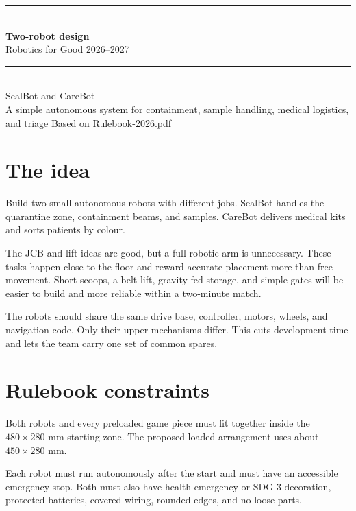 \documentclass[11pt,a4paper]{article}
\begin{document}
\hypersetup{pageanchor=false}

\begin{titlepage}
  \centering
  \vspace*{35mm}
  {\color{medicalblue}\rule{\textwidth}{1.2pt}}\\[10mm]
  {\Huge\bfseries Two-robot design\\[3mm]}
  {\Large Robotics for Good 2026--2027}\\[10mm]
  {\color{medicalblue}\rule{\textwidth}{1.2pt}}\\[18mm]
  {\Large SealBot and CareBot}\\[8mm]
  {\large A simple autonomous system for containment, sample handling, medical logistics, and triage}
  \vfill
  {\small Based on Rulebook-2026.pdf}
\end{titlepage}

\hypersetup{pageanchor=true}
\tableofcontents
\newpage
{}

\section{The idea}

Build two small autonomous robots with different jobs. SealBot handles the quarantine zone, containment beams, and samples. CareBot delivers medical kits and sorts patients by colour.

The JCB and lift ideas are good, but a full robotic arm is unnecessary. These tasks happen close to the floor and reward accurate placement more than free movement. Short scoops, a belt lift, gravity-fed storage, and simple gates will be easier to build and more reliable within a two-minute match.

The robots should share the same drive base, controller, motors, wheels, and navigation code. Only their upper mechanisms differ. This cuts development time and lets the team carry one set of common spares.

\section{Rulebook constraints}

Both robots and every preloaded game piece must fit together inside the $480 \times 280$ mm starting zone. The proposed loaded arrangement uses about $450 \times 280$ mm.

Each robot must run autonomously after the start and must have an accessible emergency stop. Both must also have health-emergency or SDG 3 decoration, protected batteries, covered wiring, rounded edges, and no loose parts.
\end{document}
